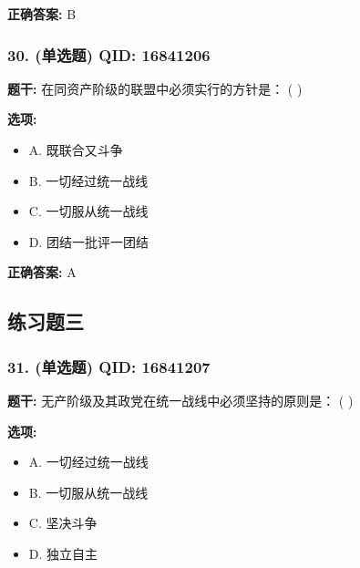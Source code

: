 \documentclass[12pt,UTF8]{ctexart}
\begin{document}
\textbf{正确答案:}
B

\vspace{0.3em}\hrulefill\vspace{0.7em}

\subsubsection*{30. (单选题) \small QID: 16841206}

\textbf{题干:}
在同资产阶级的联盟中必须实行的方针是： ( )

\textbf{选项:}
\begin{itemize}[leftmargin=*]

  \item A. 既联合又斗争

  \item B. 一切经过统一战线

  \item C. 一切服从统一战线

  \item D. 团结一批评一团结

\end{itemize}

\textbf{正确答案:}
A

\vspace{0.3em}\hrulefill\vspace{0.7em}

\subsection*{练习题三}

\subsubsection*{31. (单选题) \small QID: 16841207}

\textbf{题干:}
无产阶级及其政党在统一战线中必须坚持的原则是： ( )

\textbf{选项:}
\begin{itemize}[leftmargin=*]

  \item A. 一切经过统一战线

  \item B. 一切服从统一战线

  \item C. 坚决斗争

  \item D. 独立自主

\end{itemize}
\end{document}
